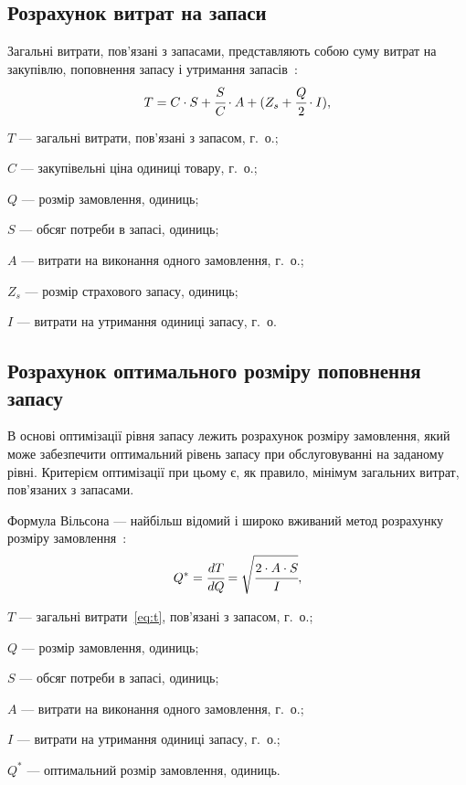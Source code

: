 \subsection{Розрахунок витрат на запаси}
Загальні витрати, пов'язані з запасами, представляють собою суму витрат на закупівлю, поповнення запасу і утримання запасів~\cite{Sterligova2008}:
\begin{equation} \label{eq:t}
T=C\cdot S+\cfrac{S}{C}\cdot A+(Z_s+\cfrac{Q}{2}\cdot I)
,
\end{equation}
\begin{description}
	\item[де] $T$ --- загальні витрати, пов'язані з запасом, г.~о.;
	\item $C$ --- закупівельні ціна одиниці товару, г.~о.;
	\item $Q$ --- розмір замовлення, одиниць;
	\item $S$ --- обсяг потреби в запасі, одиниць;
	\item $A$ --- витрати на виконання одного замовлення, г.~о.;
	\item $Z_s$ --- розмір страхового запасу, одиниць;
	\item $I$ --- витрати на утримання одиниці запасу, г.~о.
\end{description}

\subsection{Розрахунок оптимального розміру поповнення запасу}
В основі оптимізації рівня запасу лежить розрахунок розміру замовлення, який може забезпечити оптимальний рівень запасу при обслуговуванні на заданому рівні.
Критерієм оптимізації при цьому є, як правило, мінімум загальних витрат, пов'язаних з запасами.

Формула Вільсона --- найбільш відомий і широко вживаний метод розрахунку розміру замовлення~\cite{Sterligova2008}:
\begin{equation}
Q^*=\cfrac{dT}{dQ}=\sqrt{\cfrac{2\cdot A\cdot S}{I}}
,
\end{equation}
\begin{description}
	\item[де] $T$ --- загальні витрати~\eqref{eq:t}, пов'язані з запасом, г.~о.;
	\item $Q$ --- розмір замовлення, одиниць;
	\item $S$ --- обсяг потреби в запасі, одиниць;
	\item $A$ --- витрати на виконання одного замовлення, г.~о.;
	\item $I$ --- витрати на утримання одиниці запасу, г.~о.;
	\item $Q^*$ --- оптимальний розмір замовлення, одиниць.
\end{description}

